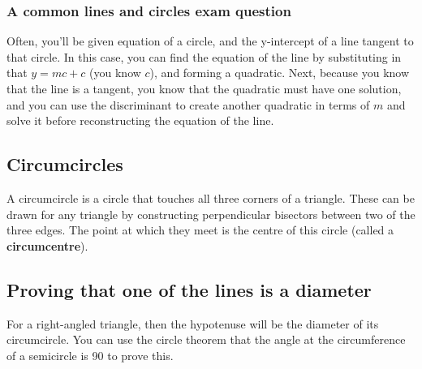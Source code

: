 \subsubsection{A common lines and circles exam question}
Often, you'll be given equation of a circle, and the y-intercept of a line tangent to that circle. In this case, you can find the equation of the line by substituting in that $y=mc+c$ (you know $c$), and forming a quadratic. Next, because you know that the line is a tangent, you know that the quadratic must have one solution, and you can use the discriminant to create another quadratic in terms of $m$ and solve it before reconstructing the equation of the line.

\subsection{Circumcircles}
A circumcircle is a circle that touches all three corners of a triangle. These can be drawn for any triangle by constructing perpendicular bisectors between two of the three edges. The point at which they meet is the centre of this circle (called a \textbf{circumcentre}).
\subsection{Proving that one of the lines is a diameter}
For a right-angled triangle, then the hypotenuse will be the diameter of its circumcircle. You can use the circle theorem that the angle at the circumference of a semicircle is 90\textdegree{} to prove this.
